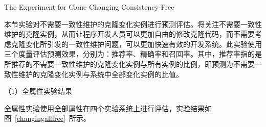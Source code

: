 
{The Experiment for Clone Changing Consistency-Free }

本节实验对不需要一致性维护的克隆变化实例进行预测评估。将关注不需要一致性维护的克隆实例，从而让程序开发人员可以更加自由的修改克隆代码，而不需要考虑克隆变化所引发的一致性维护问题，可以更加快速有效的开发系统。此实验使用三个度量评估预测效果，分别为：推荐率、精确率和召回率。其中，推荐率指的是所推荐的不需要一致性维护的克隆变化实例与所有实例的比例，即预测为不需要一致性维护的克隆变化实例与系统中全部变化实例的比值。


（1）全属性实验结果

全属性实验使用全部属性在四个实验系统上进行评估，实验结果如图~\ref{changingallfree}~所示。

